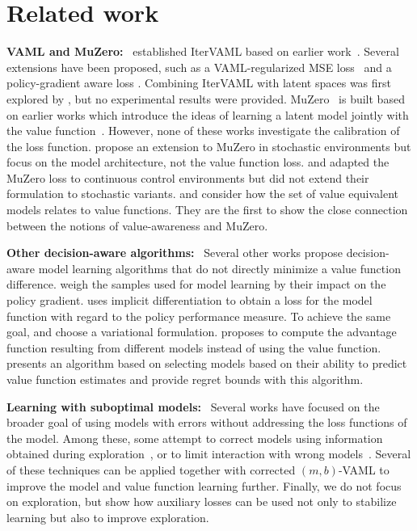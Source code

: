 \section{Related work}

\textbf{VAML and MuZero:}~ \textcite{itervaml} established IterVAML based on earlier work~\parencite{vaml}.
Several extensions have been proposed, such as a VAML-regularized MSE loss~\parencite{voelcker2022value} and a policy-gradient aware loss \parencite{abachi2020policy}.
Combining IterVAML with latent spaces was first explored by \textcite{abachi2022viper}, but no experimental results were provided.
MuZero~\parencite{schrittwieser2020mastering,ye2021mastering} is built based on earlier works which introduce the ideas of learning a latent model jointly with the value function~\parencite{silver2017predictron,oh2017value}.
However, none of these works investigate the calibration of the loss function.
\textcite{antonoglou2022planning} propose an extension to MuZero in stochastic environments but focus on the model architecture, not the value function loss.
\textcite{hansen2022temporal} and \textcite{hansen2024tdmpc} adapted the MuZero loss to continuous control environments but did not extend their formulation to stochastic variants.
\textcite{grimm2020value} and \textcite{grimm2021proper} consider how the set of value equivalent models relates to value functions. 
They are the first to show the close connection between the notions of value-awareness and MuZero.

\textbf{Other decision-aware algorithms:}~ Several other works propose decision-aware model learning algorithms that do not directly minimize a value function difference.
\textcite{doro2020gradient} weigh the samples used for model learning by their impact on the policy gradient.
\textcite{nikishin2021control} uses implicit differentiation to obtain a loss for the model function with regard to the policy performance measure. 
To achieve the same goal, \textcite{eysenbach2022mismatched} and \textcite{ghugare2023simplifying} choose a variational formulation.
\textcite{modhe2021model} proposes to compute the advantage function resulting from different models instead of using the value function.
\textcite{ayoub2020model} presents an algorithm based on selecting models based on their ability to predict value function estimates and provide regret bounds with this algorithm.

\textbf{Learning with suboptimal models:}~ Several works have focused on the broader goal of using models with errors without addressing the loss functions of the model.
Among these, some attempt to correct models using information obtained during exploration~\parencite{joseph2013reinforcement,talvitie2017self,modi2020sample,rakhsha2022operator,rakhsha2024maximum}, or to limit interaction with wrong models~\parencite{buckman2018sample,mbpo,pmlr-v119-abbas20a}.
Several of these techniques can be applied together with corrected $(m,b)$-VAML to improve the model and value function learning further.
Finally, we do not focus on exploration, but \textcite{guo2022byolexplore} show how auxiliary losses can be used not only to stabilize learning but also to improve exploration.

